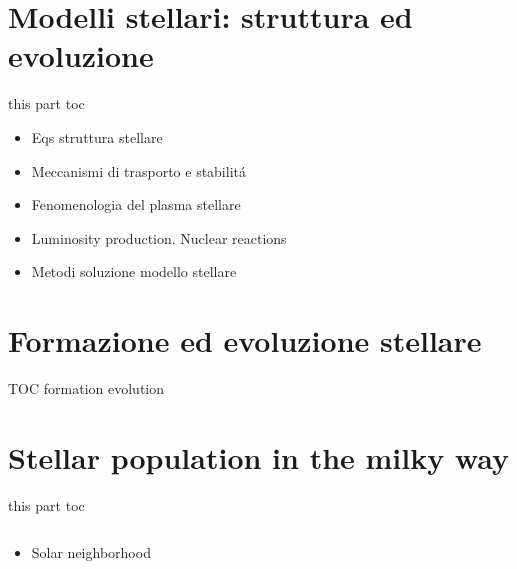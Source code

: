 \documentclass[8pt,xcolor={usenames},fleqn]{beamer}
\makeatletter
\newcommand{\linkdest}[2][\@empty]{%
    \hypertarget{\@empty}{#1}
\Hy@raisedlink{%
\hypertarget{#2}{}
}%
}
\makeatother
\begin{document}
\part{Modelli stellari: struttura ed evoluzione}%
\begin{frame}{this part toc}
\begin{itemize}
\item Eqs struttura stellare
\item Meccanismi di trasporto e stabilit\'a
\item Fenomenologia del plasma stellare
\item Luminosity production. Nuclear reactions
\item Metodi soluzione modello stellare
\end{itemize}
\end{frame}

 
  \part{Formazione ed evoluzione stellare} 
\begin{frame}{TOC formation evolution}
\tableofcontents
\end{frame}


 
 \part{Stellar population in the milky way}%
\begin{frame}{this part toc}
\begin{columns}[T]
\begin{column}{0.5\textwidth}
\begin{itemize}
	\item Solar neighborhood
\end{itemize}
\end{column}
\begin{column}{0.5\textwidth}
\tableofcontents
\end{column}
\end{columns}
\end{frame}

  
\end{document}
